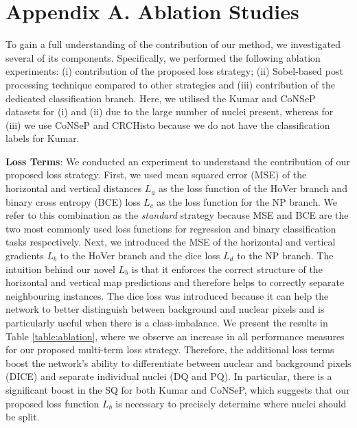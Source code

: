 \documentclass[journal]{IEEEtran}
\begin{document}
	\section*{Appendix A. Ablation Studies} 
    
	To gain a full understanding of the contribution of our method, we investigated several of its components. Specifically, we performed the following ablation experiments: (i) contribution of the proposed loss strategy; (ii) Sobel-based post processing technique compared to other strategies and (iii) contribution of the dedicated classification branch. Here, we utilised the Kumar and CoNSeP datasets for (i) and (ii) due to the large number of nuclei present, whereas for (iii) we use CoNSeP and CRCHisto because we do not have the classification labels for Kumar.
 
	\textbf{Loss Terms}: We conducted an experiment to understand the contribution of our proposed loss strategy. First, we used mean squared error (MSE) of the horizontal and vertical distances $L_a$ as the loss function of the HoVer branch and binary cross entropy (BCE) loss $L_c$ as the loss function for the NP branch. We refer to this combination as the \textit{standard} strategy because MSE and BCE are the two most commonly used loss functions for regression and binary classification tasks respectively. Next, we introduced the MSE of the horizontal and vertical gradients $L_b$ to the HoVer branch and the dice loss $L_d$ to the NP branch. The intuition behind our novel $L_b$ is that it enforces the correct structure of the horizontal and vertical map predictions and therefore helps to correctly separate neighbouring instances. The dice loss was introduced because it can help the network to better distinguish between background and nuclear pixels and is particularly useful when there is a class-imbalance. We present the results in Table \ref{table:ablation}, where we observe an increase in all performance measures for our proposed multi-term loss strategy. Therefore, the additional loss terms boost the network's ability to differentiate between nuclear and background pixels (DICE) and separate individual nuclei (DQ and PQ). In particular, there is a significant boost in the SQ for both Kumar and CoNSeP, which suggests that our proposed loss function $L_b$ is necessary to precisely determine where nuclei should be split.
	
\end{document}
